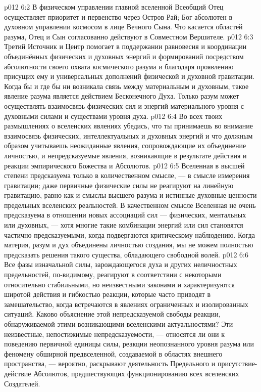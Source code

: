 \vs p012 6:2 В физическом управлении главной вселенной Всеобщий Отец осуществляет приоритет и первенство через Остров Рай; Бог абсолютен в духовном управлении космосом в лице Вечного Сына. Что касается областей разума, Отец и Сын согласованно действуют в Совместном Вершителе.
\vs p012 6:3 Третий Источник и Центр помогает в поддержании равновесия и координации объединённых физических и духовных энергий и формирований посредством абсолютности своего охвата космического разума и благодаря проявлению присущих ему и универсальных дополнений физической и духовной гравитации. Когда бы и где бы ни возникала связь между материальным и духовным, такое явление разума является действием Бесконечного Духа. Только разум может осуществлять взаимосвязь физических сил и энергий материального уровня с духовными силами и существами уровня духа.
\vs p012 6:4 Во всех твоих размышлениях о вселенских явлениях убедись, что ты принимаешь во внимание взаимосвязь физических, интеллектуальных и духовных энергий и что должным образом учитываешь неожиданные явления, сопровождающие их объединение личностью, и непредсказуемые явления, возникающие в результате действия и реакции эмпирического Божества и Абсолютов.
\vs p012 6:5 Вселенная в высшей степени предсказуема только в количественном смысле, --- в смысле измерения гравитации; даже первичные физические силы не реагируют на линейную гравитацию, равно как и смыслы высшего разума и истинные духовные ценности предельных вселенских реальностей. В качественном смысле Вселенная не очень предсказуема в отношении новых ассоциаций сил --- физических, ментальных или духовных, --- хотя многие такие комбинации энергий или сил становятся частично предсказуемыми, когда подвергаются критическому наблюдению. Когда материя, разум и дух объединены личностью создания, мы не можем полностью предсказать решения такого существа, обладающего свободной волей.
\vs p012 6:6 \pc Все фазы изначальной силы, зарождающегося духа и других неличностных предельностей, по\hyp{}видимому, реагируют в соответствии с некоторыми относительно стабильными, но неизвестными законами и характеризуются широтой действия и гибкостью реакции, которые часто приводят в замешательство, когда встречаются в явлениях ограниченных и изолированных ситуаций. Каково объяснение этой непредсказуемой свободы реакции, обнаруживаемой этими возникающими вселенскими актуальностями? Эти неизвестные, непостижимые непредсказуемости, --- относятся ли они к поведению первичной единицы силы, реакции неопознанного уровня разума или феномену обширной предвселенной, создаваемой в областях внешнего пространства, --- вероятно, раскрывают деятельность Предельного и присутствие\hyp{}действие Абсолютов, предшествующих функционированию всех вселенских Создателей.
